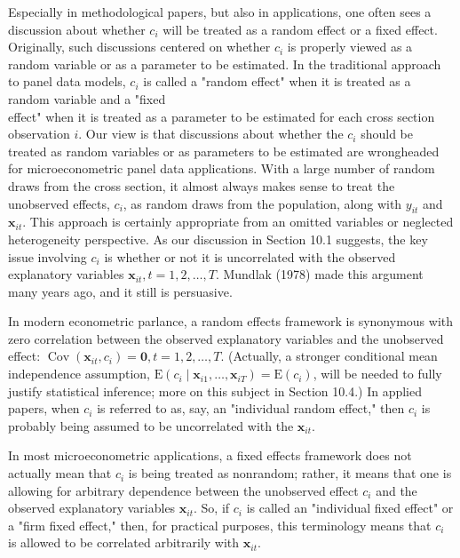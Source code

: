 \documentclass[10pt]{article}
\begin{document}
Especially in methodological papers, but also in applications, one often sees a discussion about whether $c_{i}$ will be treated as a random effect or a fixed effect. Originally, such discussions centered on whether $c_{i}$ is properly viewed as a random variable or as a parameter to be estimated. In the traditional approach to panel data models, $c_{i}$ is called a "random effect" when it is treated as a random variable and a "fixed\\
effect" when it is treated as a parameter to be estimated for each cross section observation $i$. Our view is that discussions about whether the $c_{i}$ should be treated as random variables or as parameters to be estimated are wrongheaded for microeconometric panel data applications. With a large number of random draws from the cross section, it almost always makes sense to treat the unobserved effects, $c_{i}$, as random draws from the population, along with $y_{i t}$ and $\mathbf{x}_{i t}$. This approach is certainly appropriate from an omitted variables or neglected heterogeneity perspective. As our discussion in Section 10.1 suggests, the key issue involving $c_{i}$ is whether or not it is uncorrelated with the observed explanatory variables $\mathbf{x}_{i t}, t=1,2, \ldots, T$. Mundlak (1978) made this argument many years ago, and it still is persuasive.

In modern econometric parlance, a random effects framework is synonymous with zero correlation between the observed explanatory variables and the unobserved effect: $\operatorname{Cov}\left(\mathbf{x}_{i t}, c_{i}\right)=\mathbf{0}, t=1,2, \ldots, T$. (Actually, a stronger conditional mean independence assumption, $\mathrm{E}\left(c_{i} \mid \mathbf{x}_{i 1}, \ldots, \mathbf{x}_{i T}\right)=\mathrm{E}\left(c_{i}\right)$, will be needed to fully justify statistical inference; more on this subject in Section 10.4.) In applied papers, when $c_{i}$ is referred to as, say, an "individual random effect," then $c_{i}$ is probably being assumed to be uncorrelated with the $\mathbf{x}_{i t}$.

In most microeconometric applications, a fixed effects framework does not actually mean that $c_{i}$ is being treated as nonrandom; rather, it means that one is allowing for arbitrary dependence between the unobserved effect $c_{i}$ and the observed explanatory variables $\mathbf{x}_{i t}$. So, if $c_{i}$ is called an "individual fixed effect" or a "firm fixed effect," then, for practical purposes, this terminology means that $c_{i}$ is allowed to be correlated arbitrarily with $\mathbf{x}_{i t}$.
\end{document}
